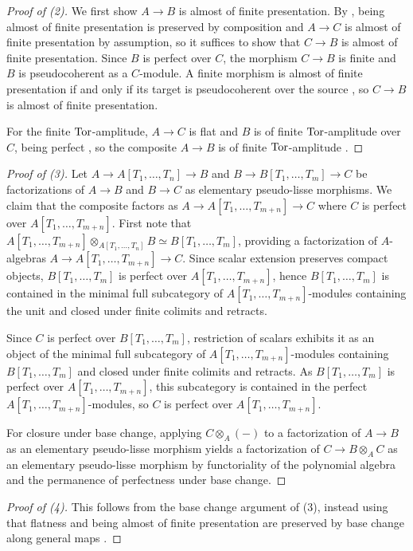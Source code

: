 \begin{proof}[Proof of (2)]
    We first show $A\to B$ is almost of finite presentation. By \cite[Cor. 7.4.3.19]{HA}, being almost of finite presentation is preserved by composition and $A\to C$ is almost of finite presentation by assumption, so it suffices to show that $C\to B$ is almost of finite presentation. Since $B$ is perfect over $C$, the morphism $C\to B$ is finite and $B$ is pseudocoherent as a $C$-module. A finite morphism is almost of finite presentation if and only if its target is pseudocoherent over the source \cite[Cor. 5.2.2.2]{SAG}, so $C\to B$ is almost of finite presentation. 

    For the finite $\mathrm{Tor}$-amplitude, $A\to C$ is flat and $B$ is of finite $\mathrm{Tor}$-amplitude over $C$, being perfect \cite[Prop. 7.2.4.23]{HA}, so the composite $A\to B$ is of finite $\mathrm{Tor}$-amplitude \cite[Lem. 6.1.1.6]{SAG}. 
\end{proof}
\begin{proof}[Proof of (3)]
    Let $A\to A[T_{1},\dots,T_{n}]\to B$ and $B\to B[T_{1},\dots,T_{m}]\to C$ be factorizations of $A\to B$ and $B\to C$ as elementary pseudo-lisse morphisms. We claim that the composite factors as $A\to A[T_{1},\dots,T_{m+n}]\to C$ where $C$ is perfect over $A[T_{1},\dots,T_{m+n}]$. First note that $A[T_{1},\dots,T_{m+n}]\otimes_{A[T_{1},\dots,T_{n}]}B\simeq B[T_{1},\dots,T_{m}]$, providing a factorization of $A$-algebras $A\to A[T_{1},\dots,T_{m+n}]\to C$. Since scalar extension preserves compact objects, $B[T_{1},\dots,T_{m}]$ is perfect over $A[T_{1},\dots,T_{m+n}]$, hence $B[T_{1},\dots,T_{m}]$ is contained in the minimal full subcategory of $A[T_{1},\dots,T_{m+n}]$-modules containing the unit and closed under finite colimits and retracts. 
    
    Since $C$ is perfect over $B[T_{1},\dots,T_{m}]$, restriction of scalars exhibits it as an object of the minimal full subcategory of $A[T_{1},\dots,T_{m+n}]$-modules containing $B[T_{1},\dots,T_{m}]$ and closed under finite colimits and retracts. As $B[T_{1},\dots,T_{m}]$ is perfect over $A[T_{1},\dots,T_{m+n}]$, this subcategory is contained in the perfect $A[T_{1},\dots,T_{m+n}]$-modules, so $C$ is perfect over $A[T_{1},\dots,T_{m+n}]$. 

    For closure under base change, applying $C\otimes_{A}(-)$ to a factorization of $A\to B$ as an elementary pseudo-lisse morphism yields a factorization of $C\to B\otimes_{A}C$ as an elementary pseudo-lisse morphism by functoriality of the polynomial algebra and the permanence of perfectness under base change.  
\end{proof}
\begin{proof}[Proof of (4)]
    This follows from the base change argument of (3), instead using that flatness and being almost of finite presentation are preserved by base change along general maps \cite[Prop. 7.2.2.16 \& Rmk. 7.2.4.28]{HA}. 
\end{proof}